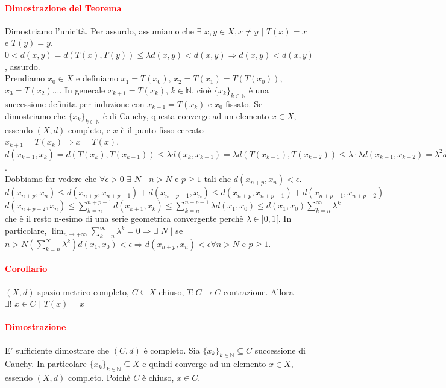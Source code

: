 \documentclass{article}
\newcommand{\N}{\mathbb{N}}
\begin{document}
\paragraph{\textcolor{red}{Dimostrazione del Teorema}}
Dimostriamo l'unicità. Per assurdo, assumiamo che $\exists \,\, x,y\in X, x \neq y \,\, | \,\, T(x)=x$ e $T(y)=y$. $0 < d(x,y)=d(T(x),T(y))\leq \lambda d(x,y) < d(x,y) \Rightarrow d(x,y) < d(x,y)$, assurdo.\\
Prendiamo $x_0 \in X$ e definiamo $x_1 = T(x_0)$, $x_2 = T(x_1)= T(T(x_0))$, $x_3 = T(x_2)$....
In generale $x_{k+1}=T(x_k)$, $k \in \N$, cioè $\{x_k\}_{k \in \N}$ è una successione definita per induzione con $x_{k+1}=T(x_k)$ e $x_0$ fissato. Se dimostriamo che $\{x_k\}_{k \in \N}$ è di Cauchy, questa converge ad un elemento $x \in X$, essendo $(X,d)$ completo, e $x$ è il punto fisso cercato $x_{k+1}=T(x_k) \Rightarrow x = T(x)$.\\
$d(x_{k+1},x_k)=d(T(x_k),T(x_{k-1}))\leq \lambda d(x_k,x_{k-1}) = \lambda d(T(x_{k-1}),T(x_{k-2}))\leq \lambda \cdot \lambda d(x_{k-1},x_{k-2})=\lambda^2d(x_{k-1},x_{k-2}) \leq \lambda^3 d() \leq...\leq \lambda^k d(x_1,x_0)$.\\
Dobbiamo far vedere che $\forall \epsilon >0 \,\, \exists \,\, N \,\, | \,\, n >N$ e $p \geq 1$ tali che $d(x_{n+p},x_n)< \epsilon$.\\
$d(x_{n+p},x_n) \leq d(x_{n+p},x_{n+p-1})+d(x_{n+p-1},x_n)\leq d(x_{n+p},x_{n+p-1})+d(x_{n+p-1},x_{n+p-2})+$$d(x_{n+p-2},x_n)\leq \sum_{k=n}^{n+p-1} d(x_{k+1},x_k)\leq \sum_{k=n}^{n+p-1} \lambda d(x_{1},x_0)\leq d(x_1,x_0)\sum_{k=n}^{\infty} \lambda^k$ che è il resto n-esimo di una serie geometrica convergente perchè $\lambda \in ]0,1[$. In particolare, $\lim_{n\rightarrow +\infty} \sum_{k=n}^{\infty}\lambda^k=0 \Rightarrow \exists\,\, N \,\, |$ se $n> N\left(\sum_{k=n}^{\infty}\lambda^k\right)d(x_1,x_0)<\epsilon \Rightarrow d(x_{n+p},x_n)<\epsilon \forall n > N$ e $p \geq 1$.
\begin{flushright}
\large\Lightning
\end{flushright}

\paragraph{\textcolor{red}{Corollario}}
$(X,d)$ spazio metrico completo, $C\subseteq X$ chiuso, $T: C \rightarrow C$ contrazione. Allora $\exists!\,\, x \in C \,\, | \,\, T(x)=x$

\paragraph{\textcolor{red}{Dimostrazione}}
E' sufficiente dimostrare che $(C,d)$ è completo. Sia $\{x_k\}_{k \in \N}\subseteq C$ successione di Cauchy. In particolare $\{x_k\}_{k \in \N} \subseteq X $ e quindi converge ad un elemento $x \in X$, essendo $(X,d)$ completo. Poichè $C$ è chiuso, $x \in C$.
\begin{flushright}
\large\Lightning
\end{flushright}
\end{document}
